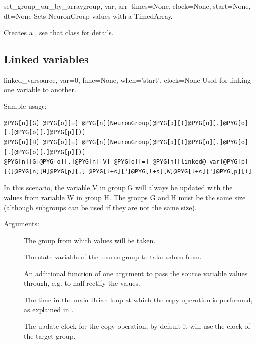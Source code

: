 \documentclass[letterpaper,10pt,english]{manual}
\begin{document}
\hypertarget{brian.set_group_var_by_array}{}\begin{funcdesc}{set\_group\_var\_by\_array}{group, var, arr, times=None, clock=None, start=None, dt=None}
Sets NeuronGroup values with a TimedArray.

Creates a \hyperlink{brian.TimedArraySetter}{}, see that class for details.
\end{funcdesc}


\subsection{Linked variables}

\hypertarget{brian.linked_var}{}\begin{funcdesc}{linked\_var}{source, var=0, func=None, when='start', clock=None}
Used for linking one \hyperlink{brian.NeuronGroup}{} variable to another.

Sample usage:

\begin{Verbatim}[commandchars=@\[\]]
@PYG[n][G] @PYG[o][=] @PYG[n][NeuronGroup]@PYG[p][(]@PYG[o][.]@PYG[o][.]@PYG[o][.]@PYG[p][)]
@PYG[n][H] @PYG[o][=] @PYG[n][NeuronGroup]@PYG[p][(]@PYG[o][.]@PYG[o][.]@PYG[o][.]@PYG[p][)]
@PYG[n][G]@PYG[o][.]@PYG[n][V] @PYG[o][=] @PYG[n][linked@_var]@PYG[p][(]@PYG[n][H]@PYG[p][,] @PYG[l+s][']@PYG[l+s][W]@PYG[l+s][']@PYG[p][)]
\end{Verbatim}

In this scenario, the variable V in group G will always be updated with
the values from variable W in group H. The groups G and H must be the
same size (although subgroups can be used if they are not the same size).

Arguments:
\begin{description}
\item[] \leavevmode
The group from which values will be taken.

\item[] \leavevmode
The state variable of the source group to take values from.

\item[] \leavevmode
An additional function of one argument to pass the source variable
values through, e.g.  to half rectify the
values.

\item[] \leavevmode
The time in the main Brian loop at which the copy operation is performed,
as explained in \hyperlink{brian.Network}{}.

\item[] \leavevmode
The update clock for the copy operation, by default it will use the clock
of the target group.

\end{description}
\end{funcdesc}
\end{document}
